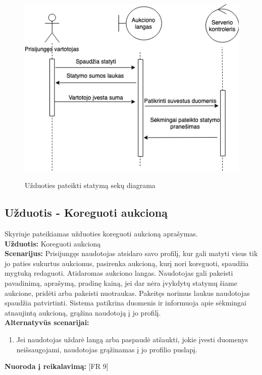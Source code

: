 \documentclass{VUMIFPSkursinis}
\begin{document}
	
		\begin{figure}[H]
		\centering
		\includegraphics[width=\linewidth]{img/bettingSequence.png}
		\label{fig:statymas}
		\caption{Užduoties pateikti statymą sekų diagrama}
	\end{figure}

	\subsection{Užduotis - Koreguoti aukcioną}
	Skyriuje pateikiamas užduoties koreguoti aukcioną aprašymas.\\
	\textbf{Užduotis:}  Koreguoti aukcioną \\
	\textbf{Scenarijus:}  Prisijungęs naudotojas atsidaro savo profilį, kur gali matyti visus tik jo paties sukurtus aukcionus, pasirenka aukcioną, kurį nori koreguoti, spaudžia mygtuką redaguoti. Atidaromas aukciono langas. Naudotojas gali pakeisti pavadinimą, aprašymą, pradinę kainą, jei dar nėra įvykdytų statymų šiame aukcione, pridėti arba pakeisti nuotraukas. Pakeitęs norimus laukus naudotojas spaudžia patvirtinti. Sistema patikrina duomenis ir informuoja apie sėkmingai atnaujintą aukcioną, grąžina naudotoją į jo profilį.  \\
	\textbf{Alternatyvūs scenarijai:}
	\begin{enumerate}
		\item Jei naudotojas uždarė langą arba paspaudė atšaukti, jokie įvesti duomenys neišsaugojami, naudotojas grąžinamas į jo profilio puslapį.
	\end{enumerate}
	\textbf{Nuoroda į reikalavimą: } [FR 9]
	
\end{document}
